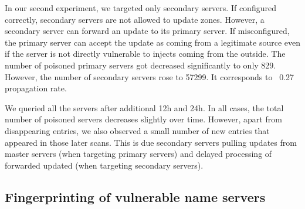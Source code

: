 In our second experiment, we targeted only secondary servers. If configured correctly, secondary servers are not allowed to update zones. However, a secondary server can forward an update to its primary server. If misconfigured, the primary server can accept the update as coming from a legitimate source even if the server is not directly vulnerable to injects coming from the outside.  The number of poisoned primary servers got decreased significantly to only 829. However, the number of secondary servers rose to 57299. It corresponds to ~0.27 propagation rate. 

We queried all the servers after additional 12h and 24h. In all cases, the total number of poisoned servers decreases slightly over time. However, apart from disappearing entries, we also observed a small number of new entries that appeared in those later scans. This is due secondary servers pulling updates from master servers (when targeting primary servers) and delayed processing of forwarded updated (when targeting secondary servers). 

\subsection{Fingerprinting of vulnerable name servers}
